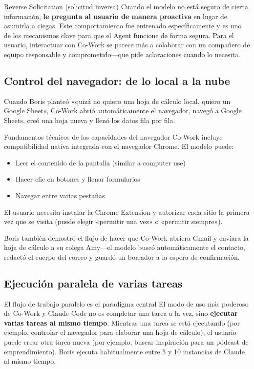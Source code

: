\begin{importantbox}{Reverse Solicitation (solicitud inversa)}
Cuando el modelo no está seguro de cierta información, \textbf{le pregunta al usuario de manera proactiva} en lugar de asumirla a ciegas. Este comportamiento fue entrenado específicamente y es uno de los mecanismos clave para que el Agent funcione de forma segura. Para el usuario, interactuar con Co-Work se parece más a colaborar con un compañero de equipo responsable y comprometido—que pide aclaraciones cuando lo necesita.
\end{importantbox}

\subsection{Control del navegador: de lo local a la nube}

Cuando Boris planteó «quizá no quiero una hoja de cálculo local, quiero un Google Sheet», Co-Work abrió automáticamente el navegador, navegó a Google Sheets, creó una hoja nueva y llenó los datos fila por fila.

\begin{knowledgebox}{Fundamentos técnicos de las capacidades del navegador}
Co-Work incluye compatibilidad nativa integrada con el navegador Chrome. El modelo puede:
\begin{itemize}
    \item Leer el contenido de la pantalla (similar a computer use)
    \item Hacer clic en botones y llenar formularios
    \item Navegar entre varias pestañas
\end{itemize}
El usuario necesita instalar la Chrome Extension y autorizar cada sitio la primera vez que se visita (puede elegir «permitir una vez» o «permitir siempre»).
\end{knowledgebox}

Boris también demostró el flujo de hacer que Co-Work abriera Gmail y enviara la hoja de cálculo a su colega Amy—el modelo buscó automáticamente el contacto, redactó el cuerpo del correo y guardó un borrador a la espera de confirmación.

\subsection{Ejecución paralela de varias tareas}

\begin{importantbox}{El flujo de trabajo paralelo es el paradigma central}
El modo de uso más poderoso de Co-Work y Claude Code no es completar una tarea a la vez, sino \textbf{ejecutar varias tareas al mismo tiempo}. Mientras una tarea se está ejecutando (por ejemplo, controlar el navegador para elaborar una hoja de cálculo), el usuario puede crear otra tarea nueva (por ejemplo, buscar inspiración para un pódcast de emprendimiento). Boris ejecuta habitualmente entre 5 y 10 instancias de Claude al mismo tiempo.
\end{importantbox}

